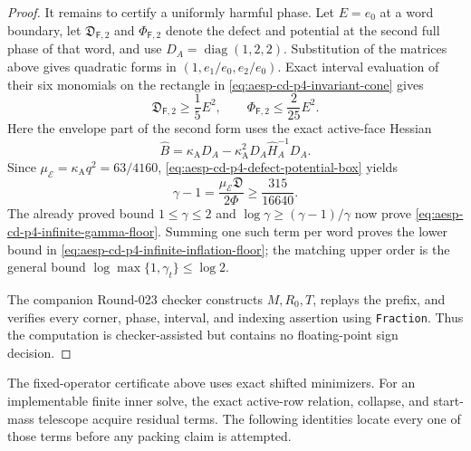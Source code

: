 \begin{proof}
It remains to certify a uniformly harmful phase.  Let $E=e_0$ at a word
boundary, let $\mathfrak D_{\mathsf F,2}$ and
$\Phi_{\mathsf F,2}$ denote the defect and potential at the second full phase
of that word, and use $D_A=\operatorname{diag}(1,2,2)$.  Substitution of the matrices above
gives quadratic forms in $(1,e_1/e_0,e_2/e_0)$.  Exact interval evaluation of
their six monomials on the rectangle in
\cref{eq:aesp-cd-p4-invariant-cone} gives
\begin{equation}
 \mathfrak D_{\mathsf F,2}\geq\frac15E^2,
 \qquad
 \Phi_{\mathsf F,2}\leq\frac2{25}E^2.
 \label{eq:aesp-cd-p4-defect-potential-box}
\end{equation}
Here the envelope part of the second form uses the exact active-face Hessian
\begin{equation*}
 \widehat B
 =\kappa_{\mathrm A}D_A
  -\kappa_{\mathrm A}^2D_A
   \widehat H_A^{-1}D_A.
\end{equation*}
Since $\mu_{\mathcal E}=\kappa_{\mathrm A}q^2=63/4160$,
\cref{eq:aesp-cd-p4-defect-potential-box} yields
\begin{equation*}
 \gamma-1
 =\frac{\mu_{\mathcal E}\mathfrak D}{2\Phi}
 \geq\frac{315}{16640}.
\end{equation*}
The already proved bound $1\leq\gamma\leq2$ and
$\log\gamma\geq(\gamma-1)/\gamma$ now prove
\cref{eq:aesp-cd-p4-infinite-gamma-floor}.  Summing one such term per word
proves the lower bound in
\cref{eq:aesp-cd-p4-infinite-inflation-floor}; the matching upper order is
the general bound $\log\max\{1,\gamma_t\}\leq\log2$.

The companion Round-023 checker constructs $M,R_0,T$, replays the prefix,
and verifies every corner, phase, interval, and indexing assertion using
\texttt{Fraction}.  Thus the computation is checker-assisted but contains no
floating-point sign decision.
\end{proof}

The fixed-operator certificate above uses exact shifted minimizers.  For an
implementable finite inner solve, the exact active-row relation, collapse,
and start-mass telescope acquire residual terms.  The following identities
locate every one of those terms before any packing claim is attempted.

